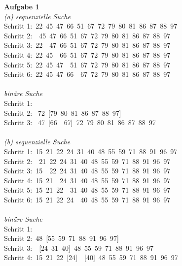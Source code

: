 \documentclass[12pt,a4paper]{article}
\begin{document}
\noindent \textbf{Aufgabe 1} \\
\textit{(a) sequenzielle Suche}\\
\indent Schritt 1:\quad {}\ 22\ 45\ 47\ 66\ 51\ 67\ 72\ 79\ 80\ 81\ 86\ 87\ 88\ 97\\
\indent Schritt 2:\ \ 45\ 47\ 66\ 51\ 67\ 72\ 79\ 80\ 81\ 86\ 87\ 88\ 97\\
\indent Schritt 3:\ 22\ \ 47\ 66\ 51\ 67\ 72\ 79\ 80\ 81\ 86\ 87\ 88\ 97\\
\indent Schritt 4:\ 22\ 45\ \ 66\ 51\ 67\ 72\ 79\ 80\ 81\ 86\ 87\ 88\ 97\\
\indent Schritt 5:\ 22\ 45\ 47\ \ 51\ 67\ 72\ 79\ 80\ 81\ 86\ 87\ 88\ 97\\
\indent Schritt 6:\ 22\ 45\ 47\ 66\ \ 67\ 72\ 79\ 80\ 81\ 86\ 87\ 88\ 97\\
\\
\indent \textit{bin\"are Suche} \\
\indent Schritt 1: \quad [11\ 22\ 45\ 47\ 66\ 51\ 67\ \fbox{72}\ 79\ 80\ 81\ 86\ 87\ 88\ 97]\\
\indent Schritt 2: \quad [11\ 22\ 45\ \fbox{47}\ 66\ 51\ 67]\ 72\ [79\ 80\ 81\ 86\ 87\ 88\ 97]\\
\indent Schritt 3: \quad [11\ 22\ 45]\ 47\ [66\ \ 67]\ 72\ 79\ 80\ 81\ 86\ 87\ 88\ 97\\
\\
\textit{(b) sequenzielle Suche}\\
\indent Schritt 1:\quad {}\ 15\ 21\ 22\ 24\ 31\ 40\ 48\ 55\ 59\ 71\ 88\ 91\ 96\ 97\\
\indent Schritt 2:\ \ 21\ 22\ 24\ 31\ 40\ 48\ 55\ 59\ 71\ 88\ 91\ 96\ 97\\
\indent Schritt 3:\ 15\ \ 22\ 24\ 31\ 40\ 48\ 55\ 59\ 71\ 88\ 91\ 96\ 97\\
\indent Schritt 4:\ 15\ 21\ \ 24\ 31\ 40\ 48\ 55\ 59\ 71\ 88\ 91\ 96\ 97\\
\indent Schritt 5:\ 15\ 21\ 22\ \ 31\ 40\ 48\ 55\ 59\ 71\ 88\ 91\ 96\ 97\\
\indent Schritt 6:\ 15\ 21\ 22\ 24\ \ 40\ 48\ 55\ 59\ 71\ 88\ 91\ 96\ 97\\
\\
\indent \textit{bin\"are Suche} \\
\indent Schritt 1:\quad [12\ 15\ 21\ 22\ 24\ 31\ 40\ \fbox{48}\ 55\ 59\ 71\ 88\ 91\ 96\ 97]\\
\indent Schritt 2:\quad [12\ 15\ 21\ \fbox{22}\ 24\ 31\ 40]\ 48\ [55\ 59\ 71\ 88\ 91\ 96\ 97]\\
\indent Schritt 3:\quad [12\ 15\ 21]\ \ [24\ 31\ 40]\ 48\ 55\ 59\ 71\ 88\ 91\ 96\ 97\\
\indent Schritt 4:\ 15\ 21\ 22\ [24]\ \ [40]\ 48\ 55\ 59\ 71\ 88\ 91\ 96\ 97\\\\
\end{document}
